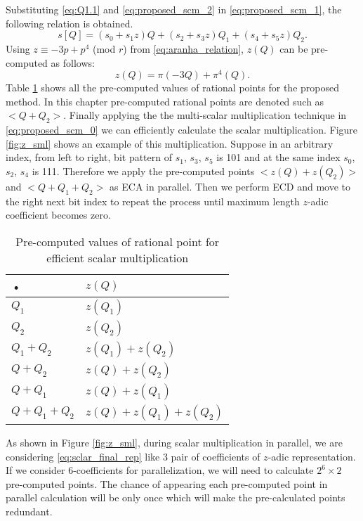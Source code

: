 Substituting \eqref{eq:Q1.1} and \eqref{eq:proposed_scm_2} in \eqref{eq:proposed_scm_1}, the following relation is obtained. 
\begin{equation}\label{eq:proposed_scm_0}
s[Q] =  (s_0+s_1z)Q + (s_2 +s_3z)Q_1 +(s_4+s_5z)Q_2.
\end{equation}
Using $z \equiv -3p + p^4$ (mod $r$) from \eqref{eq:aranha_relation}, $z(Q)$ can be pre-computed as follows:
\begin{equation}
z(Q) = \pi(-3Q) +\pi^4(Q).
\end{equation}
Table \ref{pre-compute} shows all the pre-computed values of rational points for the proposed method. In this chapter pre-computed rational points are denoted such as $<Q+Q_2>$. Finally applying the the multi-scalar multiplication technique in \eqref{eq:proposed_scm_0} we can efficiently calculate the scalar multiplication. Figure \ref{fig:z_sml} shows an example of this multiplication. Suppose in an arbitrary index, from left to right, bit pattern of $s_1$, $s_3$, $s_5$ is 101 and at the same index $s_0$, $s_2$, $s_4$ is 111. Therefore we apply the pre-computed points $< z(Q)+z(Q_2) >$ and $<Q+Q_1+Q_2>$ as ECA in parallel. Then we perform ECD and move to the right next bit index to repeat the process until maximum length $z$-adic coefficient becomes zero.

\renewcommand{\baselinestretch}{1.5}
\begin{table}[!ht]
\centering
\caption{ Pre-computed values of rational point for efficient scalar multiplication}
\label{pre-compute}
\begin{tabular}{l|l}
\hline 
• & $z(Q)$ \\ 
\hline 
$Q_1$ & $z(Q_1)$  \\ 
\hline 
$Q_2$ & $z(Q_2)$ \\ 
\hline 
$Q_1+Q_2$ & \quad  $ z(Q_1)+ z(Q_2) $ \quad \\ 
\hline 
$Q+Q_2$ & $ z(Q)+ z(Q_2) $ \\ 
\hline 
$Q+Q_1$ & $  z(Q)+ z(Q_1) $ \\ 
\hline 
 \quad $Q+Q_1+Q_2$ \quad  \quad &   \quad  $ z(Q)+ z(Q_1)+ z(Q_2)$  \quad \\ 
\hline 
\end{tabular} 
\end{table}
\renewcommand{\baselinestretch}{1.0}
As shown in Figure \ref{fig:z_sml}, during scalar multiplication in parallel, we are considering \eqref{eq:sclar_final_rep} like 3 pair of coefficients of $z$-adic representation. If we consider 6-coefficients for parallelization, we will need to calculate $2^6 \times 2$ pre-computed points. The chance of appearing each pre-computed point in parallel calculation will be only once which will make the pre-calculated points redundant.  

